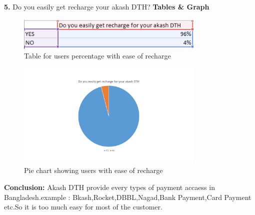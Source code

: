 \begin{spacing}{1}
{\bf 5.} Do you easily get recharge your akash DTH?\newline
{\bf Tables \& Graph}\newline
\begin{figure}[H]
	\centering
	\includegraphics[width=0.8\textwidth]{fig5_1}
	\caption{Table for users percentage with ease of recharge}
	\label{fig:Table4}
\end{figure}
\begin{figure}[H]
	\centering
	\includegraphics[width=0.8\textwidth]{fig5_2}
	\caption{Pie chart showing users with ease of recharge}
	\label{fig:pie3}
\end{figure}
{\bf Conclusion: }\newline
Akash DTH provide every types of payment accaess in Bangladesh.example : Bkash,Rocket,DBBL,Nagad,Bank Payment,Card Payment etc.So it is too much easy for most of the customer.


\end{spacing}
